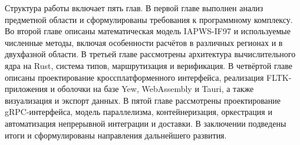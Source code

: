 Структура работы включает пять глав.
В первой главе выполнен анализ предметной области и сформулированы требования к программному комплексу.
Во второй главе описаны математическая модель IAPWS-IF97 и используемые численные методы, включая особенности расчётов в различных регионах и в двухфазной области.
В третьей главе рассмотрены архитектура вычислительного ядра на Rust, система типов, маршрутизация и верификация.
В четвёртой главе описаны проектирование кроссплатформенного интерфейса,
реализация FLTK-приложения
и оболочки на базе Yew, WebAssembly и Tauri,
а также визуализация и экспорт данных.
В пятой главе рассмотрены проектирование gRPC-интерфейса, модель параллелизма, контейнеризация, оркестрация и автоматизация непрерывной интеграции и доставки.
В заключении подведены итоги и сформулированы направления дальнейшего развития.
